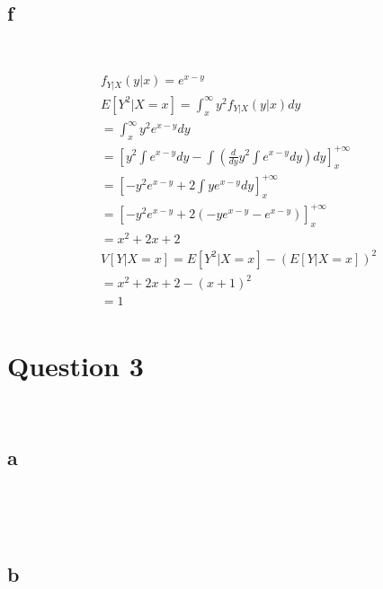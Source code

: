 \documentclass{article}
\begin{document}
~

\subsection*{f}

~

\begin{align*}
    &f_{Y|X}(y|x)=e^{x-y}\\
    &E[Y^2|X=x]=\int_{x}^{\infty}y^2f_{Y|X}(y|x)dy\\
    &=\int_{x}^{\infty}y^2e^{x-y}dy\\
    &=\left[y^2\int e^{x-y}dy-\int(\frac{d}{dy}y^2\int e^{x-y}dy)dy\right]_{x}^{+\infty}\\
    &=\left[-y^2e^{x-y}+2\int ye^{x-y}dy\right]_{x}^{+\infty}\\
    &=\left[-y^2e^{x-y}+2(-ye^{x-y}-e^{x-y})\right]_{x}^{+\infty}\\
    &=x^2+2x+2\\
    &V[Y|X=x]=E[Y^2|X=x]-(E[Y|X=x])^2\\
    &=x^2+2x+2-(x+1)^2\\
    &=1\\
\end{align*}

\newpage

\section*{Question 3}

~

\subsection*{a}

~


~

\subsection*{b}
\end{document}
